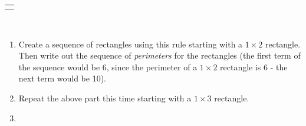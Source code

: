 \documentclass[10pt,]{book}
\theoremstyle{plain}
\theoremstyle{definition}
\theoremstyle{definition}
\theoremstyle{definition}
\theoremstyle{definition}
\numberwithin{equation}{chapter}
\newlength{\panelmax}
\begin{document}
\begin{exerciselist}
{%
\setlength{\panelmax}{0pt}
\ifdefined\panelboxAimage\else\newsavebox{\panelboxAimage}\fi%
\begin{lrbox}{\panelboxAimage}
\end{lrbox}
\ifdefined\phAimage\else\newlength{\phAimage}\fi%
\setlength{\phAimage}{\ht\panelboxAimage+\dp\panelboxAimage}
\settototalheight{\phAimage}{\usebox{\panelboxAimage}}
\setlength{\panelmax}{\maxof{\panelmax}{\phAimage}}
\leavevmode%
\setlength{\tabcolsep}{0\linewidth}
\par\medskip\noindent
\hspace*{0.2\linewidth}%
\begin{tabular}{@{}*{1}{c}@{}}
\begin{minipage}[c][\panelmax][t]{0.6\linewidth}\usebox{\panelboxAimage}\end{minipage}\end{tabular}\\
}%
\par
\hypertarget{p-210}{}%
\leavevmode%
\begin{enumerate}[label=(\alph*)]
\item\hypertarget{li-125}{}\hypertarget{p-211}{}%
Create a sequence of rectangles using this rule starting with a \(1\times 2\) rectangle. Then write out the sequence of \emph{perimeters} for the rectangles (the first term of the sequence would be 6, since the perimeter of a \(1\times 2\) rectangle is 6 - the next term would be 10). %
\item\hypertarget{li-126}{}\hypertarget{p-212}{}%
Repeat the above part this time starting with a \(1 \times 3\) rectangle. %
\item\hypertarget{li-127}{}\hypertarget{p-213}{}%

\end{enumerate}
\end{exerciselist}
\end{document}
